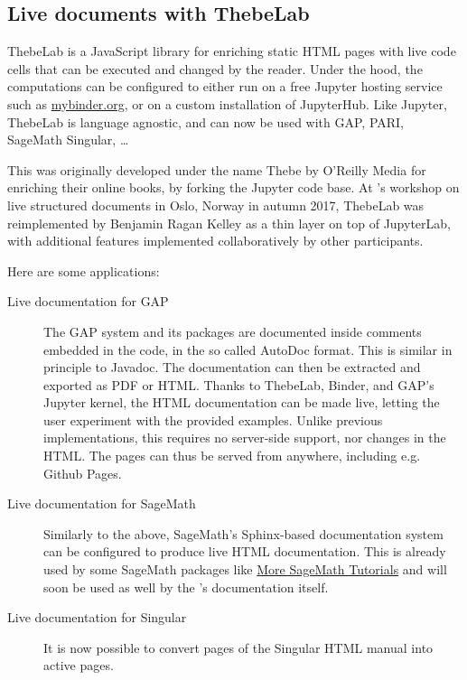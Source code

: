 \documentclass{deliverablereport}
\begin{document}
\subsection{Live documents with ThebeLab}

ThebeLab is a JavaScript library for enriching static HTML pages with live code cells
that can be executed and changed by the reader.
Under the hood, the computations can be configured to either run on a free Jupyter hosting service
such as \url{mybinder.org}, or on a custom installation of JupyterHub. Like Jupyter, ThebeLab
is language agnostic, and can now be used with GAP, PARI, SageMath Singular, \ldots

This was originally developed under the name Thebe by O'Reilly Media
for enriching their online books, by forking the Jupyter code base.
At \ODK's workshop on live structured documents in Oslo, Norway in autumn 2017, ThebeLab was
reimplemented by Benjamin Ragan Kelley as a thin layer on top of JupyterLab, with additional
features implemented collaboratively by other participants.

Here are some applications:
\begin{description}
\item[Live documentation for GAP] The GAP system and its packages are documented
inside comments embedded in the code, in the so called AutoDoc format.
This is similar in principle to Javadoc.
The documentation can then be extracted and exported as PDF or HTML.
Thanks to ThebeLab, Binder, and GAP's Jupyter kernel, the HTML documentation can be made live,
letting the user experiment with the provided examples.
Unlike previous implementations, this requires no server-side support, nor changes in the HTML.
The pages can thus be served from anywhere, including e.g. Github Pages.

\item[Live documentation for SageMath] Similarly to the above, SageMath's Sphinx-based documentation system
can be configured to produce live HTML documentation.
This is already used by some SageMath packages like
\href{http://more-sagemath-tutorials.readthedocs.io/}{More SageMath Tutorials}
and will soon be used as well by the \Sage's documentation itself.

\item[Live documentation for Singular] It is now possible to convert pages of the Singular
HTML manual into active pages.

\end{description}
\end{document}
